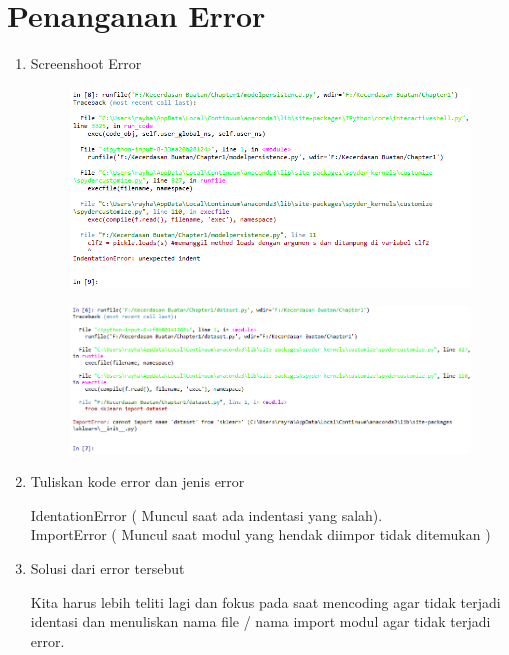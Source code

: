 \section{Penanganan Error}
\begin{enumerate}

\item Screenshoot Error
\begin{figure}[!htbp]
    \centering
    \includegraphics[scale=0.5]{figures/identasi.PNG}
    \end{figure}
    \begin{figure}[!htbp]
    \centering
    \includegraphics[scale=0.5]{figures/model.PNG}
    \end{figure}

\newpage    
\item Tuliskan kode error dan jenis error
\par 
IdentationError ( Muncul saat ada indentasi yang salah).\\
ImportError ( Muncul saat modul yang hendak diimpor tidak ditemukan )
\item Solusi dari error tersebut
\par 
Kita harus lebih teliti lagi dan fokus pada saat mencoding agar tidak terjadi identasi dan menuliskan nama file / nama import modul agar tidak terjadi error. 
\end{enumerate}


